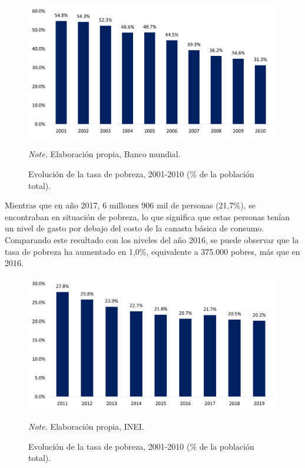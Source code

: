 \begin{figure}[H]
    \caption{Evolución de la tasa de pobreza, 2001-2010 (\% de la población total).}
    \includegraphics[scale=0.8]{Images/Ch_1_Planteamiento_problema/Imagen2.jpg}
    \label{fig:Figure2}  
    
     \begin{tablenotes}
     {\small
         \textit{Note.} Elaboración propia, Banco mundial.
     }
     \end{tablenotes}
\end{figure}

Mientras que en año 2017, 6 millones 906 mil de personas (21,7\%), se encontraban en situación de pobreza, lo que significa que estas personas tenían un nivel de gasto por debajo del costo de la canasta básica de consumo. Comparando este resultado con los niveles del año 2016, se puede observar que la tasa de pobreza ha aumentado en 1,0\%, equivalente a 375.000 pobres, más que en 2016.

\begin{figure}[H]
    \caption{Evolución de la tasa de pobreza, 2001-2010 (\% de la población total).}
    \includegraphics[scale=0.8]{Images/Ch_1_Planteamiento_problema/Imagen3.jpg}
    \label{fig:Figure3}  
    
     \begin{tablenotes}
     {\small
         \textit{Note.} Elaboración propia, INEI.
     }
     \end{tablenotes}
\end{figure}

